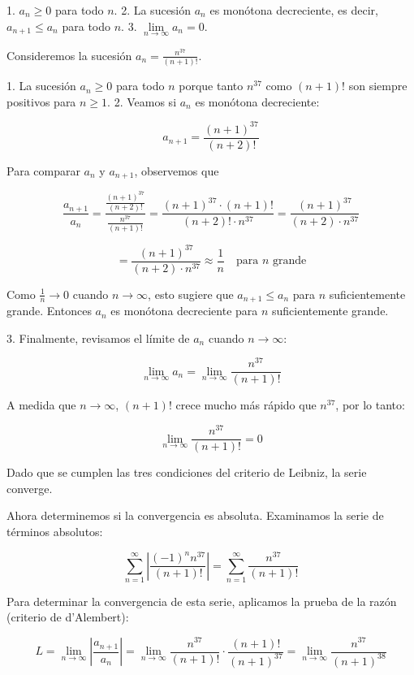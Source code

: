 \documentclass{article}
\begin{document}
    1. $a_n \ge 0$ para todo $n$.
    2. La sucesión $a_n$ es monótona decreciente, es decir, $a_{n+1} \le a_n$ para todo $n$.
    3. $\lim\limits_{n \to \infty} a_n = 0$.

    Consideremos la sucesión $a_n = \frac{n^{37}}{(n+1)!}$.

    1. La sucesión $a_n \ge 0$ para todo $n$ porque tanto $n^{37}$ como $(n+1)!$ son siempre positivos para $n \ge 1$.
    2. Veamos si $a_n$ es monótona decreciente:

    \[
    a_{n+1} = \frac{(n+1)^{37}}{(n+2)!}
    \]

    Para comparar $a_n$ y $a_{n+1}$, observemos que

    \[
    \frac{a_{n+1}}{a_n} = \frac{\frac{(n+1)^{37}}{(n+2)!}}{\frac{n^{37}}{(n+1)!}} = \frac{(n+1)^{37} \cdot (n+1)!}{(n+2)! \cdot n^{37}} = \frac{(n+1)^{37}}{(n+2) \cdot n^{37}}
    \]

    \[
    = \frac{(n+1)^{37}}{(n+2) \cdot n^{37}} \approx \frac{1}{n} \quad \text{para $n$ grande}
    \]

    Como $\frac{1}{n} \to 0$ cuando $n \to \infty$, esto sugiere que $a_{n+1} \le a_n$ para $n$ suficientemente grande. Entonces $a_n$ es monótona decreciente para $n$ suficientemente grande.

    3. Finalmente, revisamos el límite de $a_n$ cuando $n \to \infty$:

    \[
    \lim\limits_{n \to \infty} a_n = \lim\limits_{n \to \infty} \frac{n^{37}}{(n+1)!}
    \]

    A medida que $n \to \infty$, $(n+1)!$ crece mucho más rápido que $n^{37}$, por lo tanto:

    \[
    \lim\limits_{n \to \infty} \frac{n^{37}}{(n+1)!} = 0
    \]

    Dado que se cumplen las tres condiciones del criterio de Leibniz, la serie converge.

    Ahora determinemos si la convergencia es absoluta. Examinamos la serie de términos absolutos:

    \[
    \sum_{n=1}^{\infty} \left| \frac{(-1)^{n} n^{37}}{(n+1)!} \right| = \sum_{n=1}^{\infty} \frac{n^{37}}{(n+1)!}
    \]

    Para determinar la convergencia de esta serie, aplicamos la prueba de la razón (criterio de d'Alembert):

    \[
    L = \lim\limits_{n \to \infty} \left| \frac{a_{n+1}}{a_n} \right| = \lim\limits_{n \to \infty} \frac{n^{37}}{(n+1)!} \cdot \frac{(n+1)!}{(n+1)^{37}} = \lim\limits_{n \to \infty} \frac{n^{37}}{(n+1)^{38}}
    \]
\end{document}
